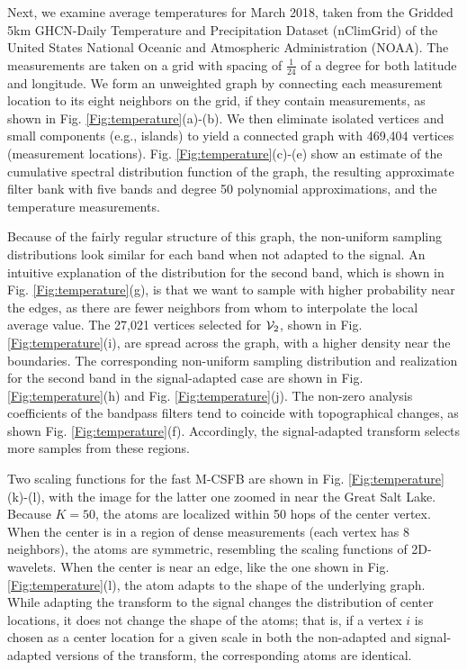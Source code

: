 \documentclass[journal, 10pt]{IEEEtran}
\begin{document}
Next, we examine average temperatures for March 2018, taken from the Gridded 5km GHCN-Daily Temperature and Precipitation Dataset (nClimGrid) \cite{nClimGrid1,nClimGrid2} of the United States National Oceanic and Atmospheric Administration (NOAA). The measurements are taken on a grid with spacing of $\frac{1}{24}$ of a degree for both latitude and longitude. We form an unweighted graph by connecting each measurement location to its eight neighbors on the grid, if they contain measurements, as shown in Fig. \ref{Fig:temperature}(a)-(b). We then eliminate isolated vertices and small components (e.g., islands) to yield a connected graph with 469,404 vertices (measurement locations). Fig. \ref{Fig:temperature}(c)-(e) show an estimate of the cumulative spectral distribution function of the graph, the resulting approximate filter bank with five bands and degree 50 polynomial approximations, and the temperature measurements. 

Because of the fairly regular structure of this graph, the non-uniform sampling distributions look similar for each band when not adapted to the signal. An intuitive explanation of the distribution for the second band, which is shown in Fig. \ref{Fig:temperature}(g), is that we want to sample with higher probability near the edges, as there are fewer neighbors from whom to interpolate the local average value. The 27,021 vertices selected for ${\mathcal{V}}_2$, shown in Fig. \ref{Fig:temperature}(i), are spread across the graph, with a higher density near the boundaries. The corresponding non-uniform sampling distribution and realization for the second band in the signal-adapted case are shown in Fig. \ref{Fig:temperature}(h) and Fig. \ref{Fig:temperature}(j). The non-zero analysis coefficients of the bandpass filters tend to coincide with topographical changes, as shown Fig. \ref{Fig:temperature}(f). Accordingly, the signal-adapted transform selects more samples from these regions.

Two scaling functions for the fast M-CSFB are shown in Fig. \ref{Fig:temperature}(k)-(l), with the image for the latter one zoomed in near the Great Salt Lake. Because $K=50$, the atoms are localized within 50 hops of the center vertex. When the center is in a region of dense measurements (each vertex has 8 neighbors), the atoms are symmetric, resembling the scaling functions of 2D-wavelets. When the center is near an edge, like the one shown in Fig. \ref{Fig:temperature}(l), the atom adapts to the shape of the underlying graph. While adapting the transform to the signal changes the distribution of center locations, it does not change the shape of the atoms; that is, if a vertex $i$ is chosen as a center location for a given scale in both the non-adapted and signal-adapted versions of the transform, the corresponding atoms are identical. 
\end{document}
